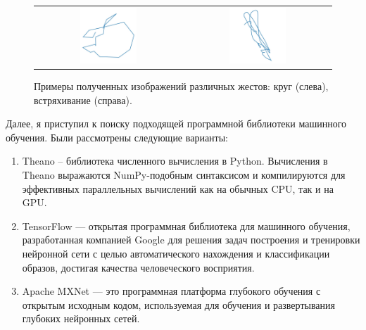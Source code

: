 \begin{figure}[H]
    \begin{center}
        \begin{tabular}{cc}
            \includegraphics[width=0.4\textwidth]{max_kt2_images/image4.jpg} & 
            \includegraphics[width=0.4\textwidth]{max_kt2_images/image2.jpg} \\
        \end{tabular}
    \end{center}
    \caption{Примеры полученных изображений различных жестов: круг (слева), встряхивание (справа).}
\end{figure}


Далее, я приступил к поиску подходящей программной библиотеки машинного обучения. Были рассмотрены следующие варианты:
\begin{enumerate}
    \item Theano -- библиотека численного вычисления в Python. Вычисления в Theano выражаются NumPy-подобным синтаксисом и компилируются для эффективных параллельных вычислений как на обычных CPU, так и на GPU.
    \item TensorFlow — открытая программная библиотека для машинного обучения, разработанная компанией Google для решения задач построения и тренировки нейронной сети с целью автоматического нахождения и классификации образов, достигая качества человеческого восприятия.
    \item Apache MXNet —  это программная платформа глубокого обучения с открытым исходным кодом, используемая для обучения и развертывания глубоких нейронных сетей.
\end{enumerate}

